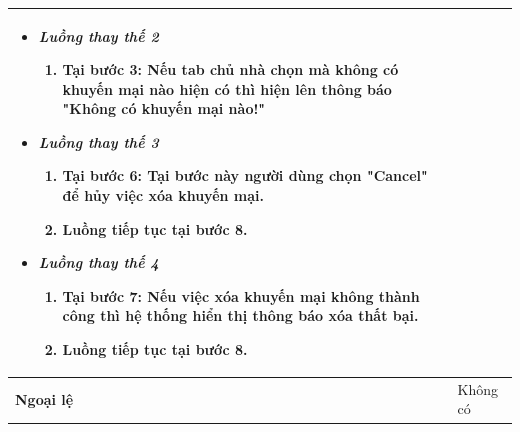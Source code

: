 \begin{center}
\begin{longtable}{ | l |p{10cm}|}
\begin{itemize}
			\item \textit{Luồng thay thế 2}
			\begin{enumerate}
				\item Tại bước 3: Nếu tab chủ nhà chọn mà không có khuyến mại nào hiện có thì hiện lên thông báo "Không có khuyến mại nào!"
			\end{enumerate}
			\item \textit{Luồng thay thế 3}
			\begin{enumerate}
				\item Tại bước 6: Tại bước này người dùng chọn "Cancel" để hủy việc xóa khuyến mại.
				\item Luồng tiếp tục tại bước 8. 
			\end{enumerate}
			\item \textit{Luồng thay thế 4}
			\begin{enumerate}
				\item Tại bước 7: Nếu việc xóa khuyến mại không thành công thì hệ thống hiển thị thông báo xóa thất bại.
				\item Luồng tiếp tục tại bước 8. 
			\end{enumerate}
		\end{itemize} \\ \hline 
		\textbf{Ngoại lệ}  & Không có \\
		\hline
	\end{longtable}
\end{center}
	
